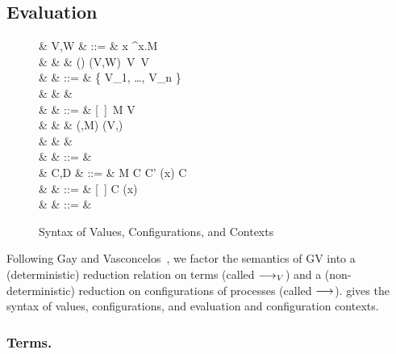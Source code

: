 \documentclass[oribibl,orivec,envcountsame]{llncs}
\begin{document}
\subsection{Evaluation}\label{sec:gv-eval}

\begin{figure}[float]
\begin{syntax}
   & V,W & ::= & x \mid \lambda^\sigma x.M \\
  & & \mid & () \mid (V,W) \mid {}\,V \mid {}\,V  \\
   & \sigma & ::= & \{  {V_1}, \dots,  {V_n} \} \\
  & & & \qquad{} \\
   & \Ex & ::= &  [~] \mid \Ex\,M \mid V\,\Ex \mid {} \\
  & & \mid & (\Ex,M) \mid (V,\Ex) \mid {} \\
  & & \mid & \,\Ex \mid {}\,\Ex \mid {} \\
  & \Fx & ::= & \phi \Ex \\
   & C,D & ::= & \phi M \mid C \parallel C' \mid (\nu x) C \\
   & \Cx & ::= & [~] \mid \Cx \parallel C \mid (\nu x)\Cx \\
   & \phi & ::= & \wcirc \mid \bcirc
\end{syntax}
\caption{Syntax of Values, Configurations, and Contexts}\label{fig:gv-eval-syntax}
\end{figure}

Following Gay and Vasconcelos~\cite{GayVasconcelos10}, we factor the semantics of GV into a
(deterministic) reduction relation on terms (called $\longrightarrow_V$) and a (non-deterministic) reduction on
configurations of processes (called $\longrightarrow$).   gives the syntax of values,
configurations, and evaluation and configuration contexts.

\subsubsection{Terms.}
\end{document}
